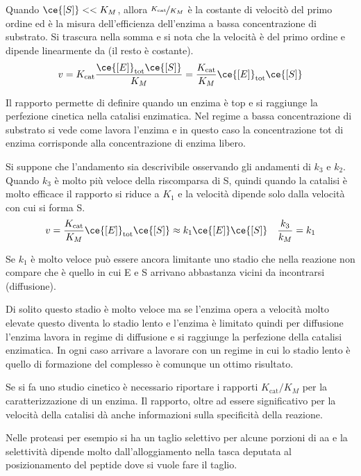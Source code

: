 Quando $\ce{[S]}<< K_M$, allora $\nicefrac{K_{\text{cat}}}{K_M}$ è la costante di velocitò del primo ordine ed è la misura dell'efficienza dell'enzima a bassa concentrazione di substrato. Si trascura \ce{[S]} nella somma e si nota che la velocità è del primo ordine e dipende linearmente da \ce{[S]} (il resto è costante).
\[
v = K_{\text{cat}} \frac{\ce{[E]}_{\text{tot}} \ce{[S]}}{K_M} = \frac{K_{\text{cat}}}{K_M} \ce{[E]}_{\text{tot}} \ce{[S]}
\]

Il rapporto permette di definire quando un enzima è top e si raggiunge la perfezione cinetica nella catalisi enzimatica.
Nel regime a bassa concentrazione di substrato si vede come lavora l’enzima e in
questo caso la concentrazione tot di enzima corrisponde alla concentrazione di enzima
libero.

Si suppone che l’andamento sia descrivibile osservando gli andamenti di $k_3$ e $k_2$.
Quando $k_3$ è molto più veloce della riscomparsa di S, quindi quando la catalisi è
molto efficace il rapporto si riduce a $K_1$ e la velocità dipende solo dalla velocità con
cui si forma S.
\[
v = \frac{K_{\text{cat}}}{K_M} \ce{[E]}_{\text{tot}} \ce{[S]} \approx k_1 \ce{[E]} \ce{[S]} \quad \frac{k_3}{k_M} = k_1
\]

Se $k_1$ è molto veloce può essere ancora limitante uno stadio che nella reazione non compare che è quello in cui E e S arrivano abbastanza vicini da incontrarsi (diffusione).

Di solito questo stadio è molto veloce ma se l’enzima opera a velocità molto elevate
questo diventa lo stadio lento e l’enzima è limitato quindi per diffusione l’enzima
lavora in regime di diffusione e si raggiunge la perfezione della catalisi enzimatica.
In ogni caso arrivare a lavorare con un regime in cui lo stadio lento è quello di
formazione del complesso è comunque un ottimo risultato.


Se si fa uno studio cinetico è necessario riportare i rapporti $K_{\text{cat}}/K_M$ per la caratterizzazione di un enzima.
Il rapporto, oltre ad essere significativo per la velocità della catalisi dà anche informazioni sulla specificità della reazione.

Nelle proteasi per esempio si ha un taglio selettivo per alcune porzioni di aa e la
selettività dipende molto dall’alloggiamento nella tasca deputata al posizionamento
del peptide dove si vuole fare il taglio.

